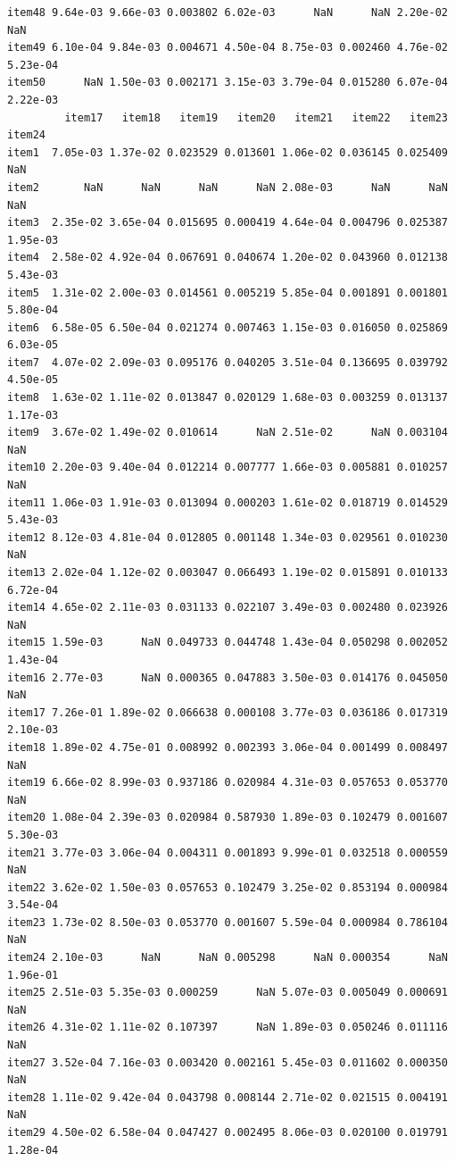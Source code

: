 \documentclass[
  a4paper,
]{ltjsbook}
\begin{document}
\begin{verbatim}
item48 9.64e-03 9.66e-03 0.003802 6.02e-03      NaN      NaN 2.20e-02      NaN
item49 6.10e-04 9.84e-03 0.004671 4.50e-04 8.75e-03 0.002460 4.76e-02 5.23e-04
item50      NaN 1.50e-03 0.002171 3.15e-03 3.79e-04 0.015280 6.07e-04 2.22e-03
         item17   item18   item19   item20   item21   item22   item23   item24
item1  7.05e-03 1.37e-02 0.023529 0.013601 1.06e-02 0.036145 0.025409      NaN
item2       NaN      NaN      NaN      NaN 2.08e-03      NaN      NaN      NaN
item3  2.35e-02 3.65e-04 0.015695 0.000419 4.64e-04 0.004796 0.025387 1.95e-03
item4  2.58e-02 4.92e-04 0.067691 0.040674 1.20e-02 0.043960 0.012138 5.43e-03
item5  1.31e-02 2.00e-03 0.014561 0.005219 5.85e-04 0.001891 0.001801 5.80e-04
item6  6.58e-05 6.50e-04 0.021274 0.007463 1.15e-03 0.016050 0.025869 6.03e-05
item7  4.07e-02 2.09e-03 0.095176 0.040205 3.51e-04 0.136695 0.039792 4.50e-05
item8  1.63e-02 1.11e-02 0.013847 0.020129 1.68e-03 0.003259 0.013137 1.17e-03
item9  3.67e-02 1.49e-02 0.010614      NaN 2.51e-02      NaN 0.003104      NaN
item10 2.20e-03 9.40e-04 0.012214 0.007777 1.66e-03 0.005881 0.010257      NaN
item11 1.06e-03 1.91e-03 0.013094 0.000203 1.61e-02 0.018719 0.014529 5.43e-03
item12 8.12e-03 4.81e-04 0.012805 0.001148 1.34e-03 0.029561 0.010230      NaN
item13 2.02e-04 1.12e-02 0.003047 0.066493 1.19e-02 0.015891 0.010133 6.72e-04
item14 4.65e-02 2.11e-03 0.031133 0.022107 3.49e-03 0.002480 0.023926      NaN
item15 1.59e-03      NaN 0.049733 0.044748 1.43e-04 0.050298 0.002052 1.43e-04
item16 2.77e-03      NaN 0.000365 0.047883 3.50e-03 0.014176 0.045050      NaN
item17 7.26e-01 1.89e-02 0.066638 0.000108 3.77e-03 0.036186 0.017319 2.10e-03
item18 1.89e-02 4.75e-01 0.008992 0.002393 3.06e-04 0.001499 0.008497      NaN
item19 6.66e-02 8.99e-03 0.937186 0.020984 4.31e-03 0.057653 0.053770      NaN
item20 1.08e-04 2.39e-03 0.020984 0.587930 1.89e-03 0.102479 0.001607 5.30e-03
item21 3.77e-03 3.06e-04 0.004311 0.001893 9.99e-01 0.032518 0.000559      NaN
item22 3.62e-02 1.50e-03 0.057653 0.102479 3.25e-02 0.853194 0.000984 3.54e-04
item23 1.73e-02 8.50e-03 0.053770 0.001607 5.59e-04 0.000984 0.786104      NaN
item24 2.10e-03      NaN      NaN 0.005298      NaN 0.000354      NaN 1.96e-01
item25 2.51e-03 5.35e-03 0.000259      NaN 5.07e-03 0.005049 0.000691      NaN
item26 4.31e-02 1.11e-02 0.107397      NaN 1.89e-03 0.050246 0.011116      NaN
item27 3.52e-04 7.16e-03 0.003420 0.002161 5.45e-03 0.011602 0.000350      NaN
item28 1.11e-02 9.42e-04 0.043798 0.008144 2.71e-02 0.021515 0.004191      NaN
item29 4.50e-02 6.58e-04 0.047427 0.002495 8.06e-03 0.020100 0.019791 1.28e-04

\end{verbatim}
\end{document}
